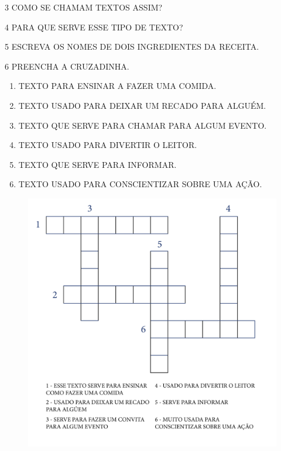 \num{3} COMO SE CHAMAM TEXTOS ASSIM?


\num{4} PARA QUE SERVE ESSE TIPO DE TEXTO?


\num{5} ESCREVA OS NOMES DE DOIS INGREDIENTES DA RECEITA.




\num{6} PREENCHA A CRUZADINHA. 

\begin{enumerate}[itemsep=-5pt]
	\item TEXTO PARA ENSINAR A FAZER UMA COMIDA.
	\item TEXTO USADO PARA DEIXAR UM RECADO PARA ALGUÉM.
	\item TEXTO QUE SERVE PARA CHAMAR PARA ALGUM EVENTO.
	\item TEXTO USADO PARA DIVERTIR O LEITOR.
	\item TEXTO QUE SERVE PARA INFORMAR.
	\item TEXTO USADO PARA CONSCIENTIZAR SOBRE UMA AÇÃO.
\end{enumerate}

\begin{figure}[H]
\centering
\includegraphics[width=.9\textwidth]{media/image155.png}
\end{figure}

